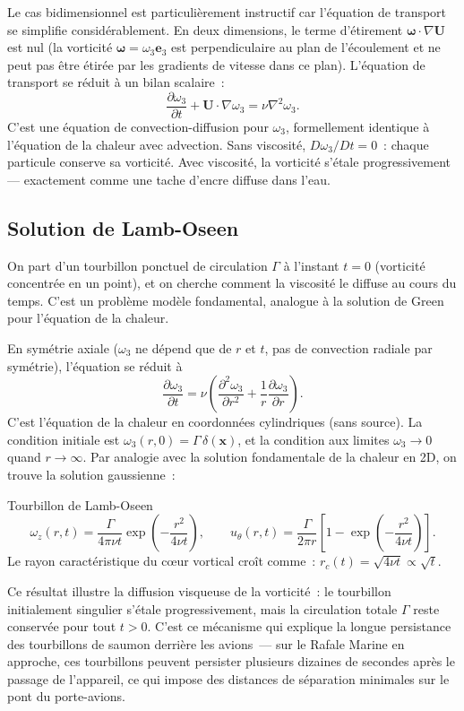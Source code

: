 \documentclass[11pt,a4paper]{report}
\newcommand{\pd}[2]{\dfrac{\partial #1}{\partial #2}}
\begin{document}
Le cas bidimensionnel est particuli\`erement instructif car l'\'equation de transport
se simplifie consid\'erablement. En deux dimensions, le terme d'\'etirement
$\boldsymbol{\omega}\cdot\nabla\bm{U}$ est nul (la vorticit\'e $\boldsymbol{\omega}
= \omega_3\bm{e}_3$ est perpendiculaire au plan de l'\'ecoulement et ne peut pas
\^etre \'etir\'ee par les gradients de vitesse dans ce plan). L'\'equation de transport
se r\'eduit \`a un bilan scalaire~:
\[
  \pd{\omega_3}{t} + \bm{U}\cdot\nabla\omega_3 = \nu\nabla^2\omega_3.
\]
C'est une \'equation de convection-diffusion pour $\omega_3$, formellement identique
\`a l'\'equation de la chaleur avec advection. Sans viscosit\'e, $D\omega_3/Dt = 0$~:
chaque particule conserve sa vorticit\'e. Avec viscosit\'e, la vorticit\'e s'\'etale
progressivement --- exactement comme une tache d'encre diffuse dans l'eau.

\subsection{Solution de Lamb-Oseen}

On part d'un tourbillon ponctuel de circulation $\Gamma$ \`a l'instant $t=0$
(vorticit\'e concentr\'ee en un point), et on cherche
comment la viscosit\'e le diffuse au cours du temps. C'est un probl\`eme mod\`ele
fondamental, analogue \`a la solution de Green pour l'\'equation de la chaleur.

En sym\'etrie axiale ($\omega_3$ ne d\'epend que de $r$
et $t$, pas de convection radiale par sym\'etrie), l'\'equation se r\'eduit \`a
\[
  \pd{\omega_3}{t} = \nu\left(\frac{\partial^2\omega_3}{\partial r^2}
  + \frac{1}{r}\pd{\omega_3}{r}\right).
\]
C'est l'\'equation de la chaleur en coordonn\'ees cylindriques (sans source). La condition
initiale est $\omega_3(r,0) = \Gamma\,\delta(\bm{x})$, et la condition aux limites
$\omega_3 \to 0$ quand $r\to\infty$. Par analogie avec la solution fondamentale de la
chaleur en 2D, on trouve la solution gaussienne~:

\begin{importantbox}{Tourbillon de Lamb-Oseen}
\[
  \omega_z(r,t) = \frac{\Gamma}{4\pi\nu t}\exp\!\left(-\frac{r^2}{4\nu t}\right),
  \qquad
  u_\theta(r,t) = \frac{\Gamma}{2\pi r}\left[1 - \exp\!\left(-\frac{r^2}{4\nu t}\right)\right].
\]
Le rayon caract\'eristique du c\oe ur vortical cro\^it comme~:
$r_c(t) = \sqrt{4\nu t} \propto \sqrt{t}$.
\end{importantbox}

Ce r\'esultat illustre la diffusion visqueuse de la vorticit\'e~: le tourbillon initialement
singulier s'\'etale progressivement, mais la circulation totale $\Gamma$ reste conserv\'ee
pour tout $t > 0$. C'est ce m\'ecanisme qui explique la longue persistance des tourbillons
de saumon derri\`ere les avions~--- sur le Rafale Marine en approche, ces tourbillons peuvent
persister plusieurs dizaines de secondes apr\`es le passage de l'appareil, ce qui impose des
distances de s\'eparation minimales sur le pont du porte-avions.
\end{document}
